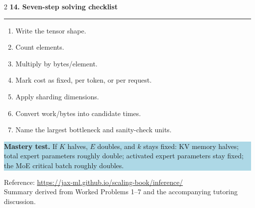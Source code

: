 \documentclass[8pt,a4paper]{extarticle}
\newcommand{\sect}[1]{%
  \vspace{2pt}%
  {\color{DeepBlue}\normalsize\bfseries #1}\par
  \vspace{0.5pt}\hrule\vspace{1.5pt}
}
\newcommand{\callout}[2][LightBlue]{%
  \vspace{1pt}\noindent
  \colorbox{#1}{%
    \parbox{\dimexpr\linewidth-2\fboxsep\relax}{\footnotesize #2}%
  }\vspace{1pt}
}
\begin{document}
\begin{multicols}{2}
\sect{14. Seven-step solving checklist}

\begin{enumerate}
  \item Write the tensor shape.
  \item Count elements.
  \item Multiply by bytes/element.
  \item Mark cost as fixed, per token, or per request.
  \item Apply sharding dimensions.
  \item Convert work/bytes into candidate times.
  \item Name the largest bottleneck and sanity-check units.
\end{enumerate}

\callout{%
\textbf{Mastery test.}
If $K$ halves, $E$ doubles, and $k$ stays fixed:
KV memory halves; total expert parameters roughly double; activated expert
parameters stay fixed; the MoE critical batch roughly doubles.
}

\vfill
{\small\color{Muted}
Reference: \url{https://jax-ml.github.io/scaling-book/inference/}\\
Summary derived from Worked Problems 1--7 and the accompanying tutoring
discussion.}

\end{multicols}
\end{document}
